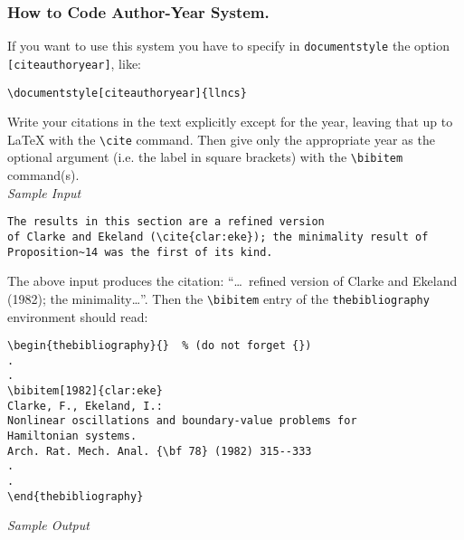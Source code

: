 \subsubsection*{How to Code Author-Year System.}
%
If you want to use this system you have to specify in
\verb|documentstyle| the option \verb|[citeauthoryear]|, like:
\begin{verbatim}
\documentstyle[citeauthoryear]{llncs}
\end{verbatim}
Write your citations in the text explicitly except for the year, leaving
that up to \LaTeX{} with the \verb|\cite| command. Then give only the
appropriate year as the optional argument (i.e. the label in square
brackets) with the \verb|\bibitem| command(s).\\[2mm]
{\it Sample Input}
\begin{verbatim}
The results in this section are a refined version
of Clarke and Ekeland (\cite{clar:eke}); the minimality result of
Proposition~14 was the first of its kind.
\end{verbatim}
The above input produces the citation: ``\dots\ refined version of
Clarke and Ekeland (1982); the minimality\dots''. Then the
\verb|\bibitem|
entry of the \verb|thebibliography| environment should read:
\begin{verbatim}
\begin{thebibliography}{}  % (do not forget {})
.
.
\bibitem[1982]{clar:eke}
Clarke, F., Ekeland, I.:
Nonlinear oscillations and boundary-value problems for
Hamiltonian systems.
Arch. Rat. Mech. Anal. {\bf 78} (1982) 315--333
.
.
\end{thebibliography}
\end{verbatim}
{\it Sample Output}
\bibauthoryear
%

